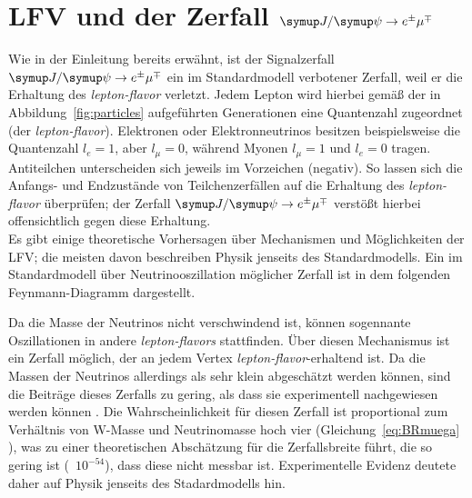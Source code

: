 \section{\texorpdfstring{LFV und der Zerfall $\signal$}{Jpsi to eµ}}
%
Wie in der Einleitung bereits erwähnt, ist der Signalzerfall $\signal$ ein im Standardmodell verbotener Zerfall, weil er die Erhaltung des \textit{lepton-flavor} verletzt. Jedem Lepton wird hierbei gemäß der in Abbildung~\ref{fig:particles} aufgeführten Generationen eine Quantenzahl zugeordnet (der \textit{lepton-flavor}). Elektronen oder Elektronneutrinos besitzen beispielsweise die Quantenzahl $l_e=1$, aber $l_\mu=0$, während Myonen $l_\mu=1$ und $l_e=0$ tragen. Antiteilchen unterscheiden sich jeweils im Vorzeichen (negativ). So lassen sich die Anfangs- und Endzustände von Teilchenzerfällen auf die Erhaltung des \textit{lepton-flavor} überprüfen; der Zerfall $\signal$ verstößt hierbei offensichtlich gegen diese Erhaltung.\\
%
Es gibt einige theoretische Vorhersagen über Mechanismen und Möglichkeiten der LFV; die meisten davon beschreiben Physik jenseits des Standardmodells. Ein im Standardmodell über Neutrinooszillation möglicher Zerfall ist in dem folgenden Feynmann-Diagramm dargestellt.
%
\begin{figure}[H]
  \centering
  \label{fig:lfv_nu}
\end{figure}
%
Da die Masse der Neutrinos nicht verschwindend ist, können sogennante Oszillationen in andere \textit{lepton-flavors} stattfinden. Über diesen Mechanismus ist ein Zerfall möglich, der an jedem Vertex \textit{lepton-flavor}-erhaltend ist. Da die Massen der Neutrinos allerdings als sehr klein abgeschätzt werden können, sind die Beiträge dieses Zerfalls zu gering, als dass sie experimentell nachgewiesen werden können \cite{neutrinos}. Die Wahrscheinlichkeit für diesen Zerfall ist proportional zum Verhältnis von W-Masse und Neutrinomasse hoch vier (Gleichung~\ref{eq:BRmuega} \cite{neutrino}), was zu einer theoretischen Abschätzung für die Zerfallsbreite führt, die so gering ist (~$10^{-54}$), dass diese nicht messbar ist. Experimentelle Evidenz deutete daher auf Physik jenseits des Stadardmodells hin.
